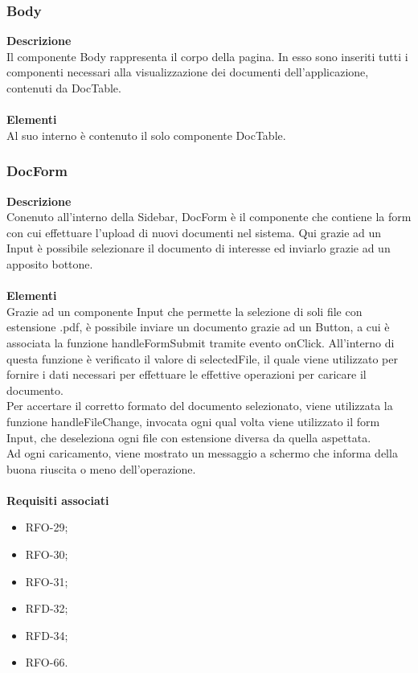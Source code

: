 \subsubsection{Body}

\textbf{Descrizione}\\
Il componente Body rappresenta il corpo della pagina. In esso sono inseriti tutti i componenti necessari alla visualizzazione dei documenti dell'applicazione, contenuti da DocTable.\\ \\
\textbf{Elementi}\\
Al suo interno è contenuto il solo componente DocTable.

\subsubsection{DocForm}

\textbf{Descrizione}\\
Conenuto all'interno della Sidebar, DocForm è il componente che contiene la form con cui effettuare l'upload di nuovi documenti nel sistema. Qui grazie ad un Input è possibile selezionare il documento di interesse ed inviarlo grazie ad un apposito bottone.\\ \\
\textbf{Elementi}\\
Grazie ad un componente Input che permette la selezione di soli file con estensione .pdf, è possibile inviare un documento grazie ad un Button, a cui è associata la funzione handleFormSubmit tramite evento onClick. All'interno di questa funzione è verificato il valore di selectedFile, il quale viene utilizzato per fornire i dati necessari per effettuare le effettive operazioni per caricare il documento.\\
Per accertare il corretto formato del documento selezionato, viene utilizzata la funzione handleFileChange, invocata ogni qual volta viene utilizzato il form Input, che deseleziona ogni file con estensione diversa da quella aspettata.\\
Ad ogni caricamento, viene mostrato un messaggio a schermo che informa della buona riuscita o meno dell'operazione.\\ \\
\textbf{Requisiti associati}
\begin{itemize}
    \item RFO-29;
    \item RFO-30;
    \item RFO-31;
    \item RFD-32;
    \item RFD-34;
    \item RFO-66.
\end{itemize}

